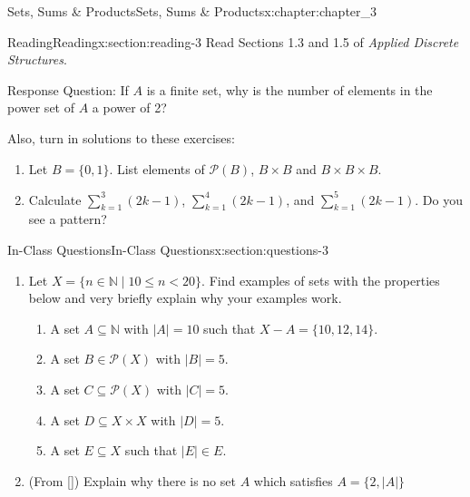 \documentclass[oneside,10pt,]{book}
\newcommand{\xreffont}{\relax}
\numberwithin{equation}{section}
\newcommand{\card}[1]{\left| #1 \right|}
\newcommand{\lt}{<}
\begin{document}
\begin{chapterptx}{Sets, Sums \& Products}{}{Sets, Sums \& Products}{}{}{x:chapter:chapter_3}
%
%
%
%
%
\typeout{************************************************}
\typeout{************************************************}
%
\begin{sectionptx}{Reading}{}{Reading}{}{}{x:section:reading-3}
Read Sections 1.3 and 1.5 of \emph{Applied Discrete Structures}.%
\par
Response Question:  If \(A\) is a finite set, why is the number of elements in the power set of \(A\) a power of 2?%
\par
Also, turn in solutions to these exercises:%
\begin{enumerate}[label=\arabic*.]
\item{}Let \(B=\{0,1\}\).  List elements of  \(\mathcal{P}(B)\),  \(B\times B\) and \(B\times B\times B\).%
\item{}Calculate \(\sum_{k=1}^3 (2k-1)\), \(\sum_{k=1}^4 (2k-1)\), and \(\sum_{k=1}^5 (2k-1)\). Do you see a pattern?%
\end{enumerate}
%
\end{sectionptx}
%
%
\typeout{************************************************}
\typeout{************************************************}
%
\begin{sectionptx}{In-Class Questions}{}{In-Class Questions}{}{}{x:section:questions-3}
%
\begin{enumerate}[label=\arabic*.]
\item{}Let \(X = \{n \in \mathbb{N} \mid 10 \leq n \lt 20\}\).  Find examples of sets with the properties below and very briefly explain why your examples work.%
\begin{enumerate}[label=(\alph*)]
\item{}A set \(A \subseteq \mathbb{N}\) with \(\lvert A \rvert = 10\) such that \(X - A = \{10, 12, 14\}\).%
\item{}A set \(B \in \mathcal{P}(X)\) with \(\lvert B\rvert = 5\).%
\item{}A set \(C \subseteq \mathcal{P}(X)\) with \(\lvert C\rvert = 5\).%
\item{}A set \(D \subseteq X \times X\) with \(\lvert D\rvert = 5\).%
\item{}A set \(E \subseteq X\) such that \(\lvert E\rvert \in E\).%
\end{enumerate}
%
\item{}(From \hyperlink{x:biblio:biblio-levin-2020}{[{\xreffont 3}]}) Explain why there is no set \(A\) which satisfies \(A = \{2, \card{A}\}\)%

\end{enumerate}
\end{sectionptx}
\end{chapterptx}
\end{document}
